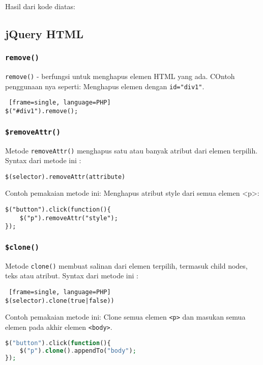 Hasil dari kode diatas: 


\subsection{jQuery HTML}
\subsubsection{\texttt{remove()}}
\texttt{remove()} - berfungsi untuk menghapus elemen HTML yang ada. COntoh penggunaan nya seperti:
Menghapus elemen dengan \texttt{id="div1"}.
\begin{lstlisting} [frame=single, language=PHP]
$("#div1").remove();
\end{lstlisting}

\subsubsection{\texttt{\$removeAttr()}}
Metode \texttt{removeAttr()} menghapus satu atau banyak atribut dari elemen terpilih.
Syntax dari metode ini :
\begin{lstlisting}[frame=single, language=jQuery]
$(selector).removeAttr(attribute)
\end{lstlisting}

Contoh pemakaian metode ini: Menghapus atribut style dari semua elemen <p>:
\begin{lstlisting}[frame=single, language=jquery]
$("button").click(function(){
	$("p").removeAttr("style");
});
\end{lstlisting}

\subsubsection{\texttt{\$clone()}}
Metode \texttt{clone()} membuat salinan dari elemen terpilih, termasuk child nodes, teks atau atribut.
Syntax dari metode ini :
\begin{lstlisting} [frame=single, language=PHP]
$(selector).clone(true|false))
\end{lstlisting}

Contoh pemakaian metode ini: Clone semua elemen \texttt{<p>} dan masukan semua elemen pada akhir elemen \texttt{<body>}.
\begin{lstlisting}[frame=single, language=PHP]
$("button").click(function(){
	$("p").clone().appendTo("body");
});
\end{lstlisting}


